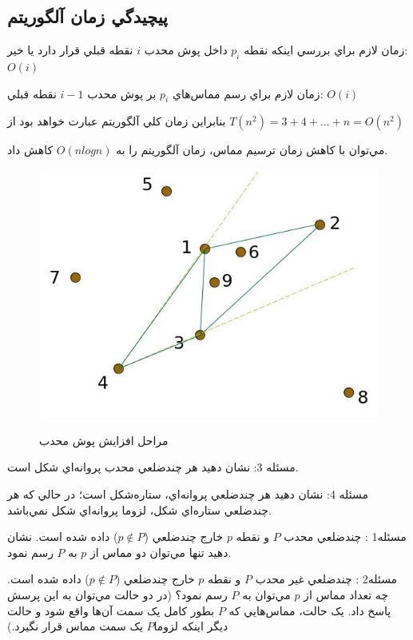 \documentclass{book}
\begin{document}
\subsection{پيچيدگي زمان آلگوريتم}

زمان لازم براي بررسي اينکه نقطه $p_i$ داخل پوش محدب $i$ نقطه قبلي قرار دارد يا خير:  $O(i)$ 

زمان لازم براي رسم مماس‌هاي $p_i$ بر پوش محدب $i-1$ نقطه قبلي: $O(i)$ 

بنابراين زمان کلي آلگوريتم عبارت خواهد بود از $T(n^2)=3+4+…+n=O(n^2)$

مي‌توان با کاهش زمان ترسيم مماس، زمان آلگوريتم را به $O(nlogn)$ کاهش داد.

\begin{figure}[h!]
    \begin{center}
        \includegraphics[width=\linewidth]{ch2.jpg}
        \label{ch2}
        \caption{مراحل افزايش پوش محدب}
    \end{center}
\end{figure}

مسئله 3: نشان دهيد هر چندضلعي محدب پروانه‌اي شكل است.

مسئله 4: نشان دهيد هر چندضلعي پروانه‌اي، ستاره‌شكل است؛ در حالي که هر چندضلعي ستاره‌اي شکل، لزوما پروانه‌اي شکل نمي‌باشد. 

مسئله1 : چندضلعي محدب $P$ و نقطه $p$ خارج چندضلعي ($p\notin P$) داده شده است. نشان دهيد تنها مي‌توان دو مماس از $p$  به $P$ رسم نمود. 

مسئله2 : چندضلعي غير محدب $P$ و نقطه $p$ خارج چندضلعي ($p\notin P$) داده شده است. چه تعداد مماس از $p$  مي‌توان به $P$ رسم نمود؟ (در دو حالت مي‌توان به اين پرسش پاسخ داد. يک حالت، مماس‌هايي که $P$ بطور کامل يک سمت آن‌ها واقع شود و حالت ديگر اينکه لزوما$P$  يک سمت مماس قرار نگيرد.)
\end{document}
